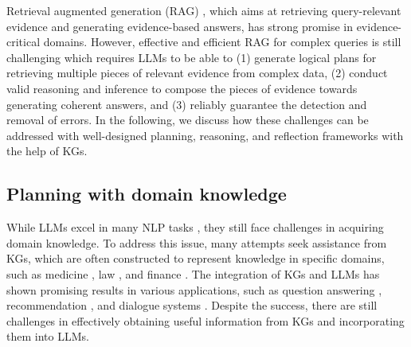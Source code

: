 Retrieval augmented generation (RAG) \cite{lewis2020retrieval}, which aims at retrieving query-relevant evidence and generating evidence-based answers, has strong promise in evidence-critical domains. However, effective and efficient RAG for complex queries is still challenging which requires LLMs to be able to (1) generate logical plans for retrieving multiple pieces of relevant evidence from complex data, (2) conduct valid reasoning and inference to compose the pieces of evidence towards generating coherent answers, and (3) reliably guarantee the detection and removal of errors. In the following, we discuss how these challenges can be addressed with well-designed planning, reasoning, and reflection frameworks with the help of KGs.

{
\newcommand{\ourmethod}{\texttt{RoG}\xspace}
\subsection{Planning with domain knowledge}
While LLMs excel in many NLP tasks \cite{brown2020language,bang2023multitask}, they still face challenges in acquiring domain knowledge. To address this issue, many attempts seek assistance from KGs, which are often constructed to represent knowledge in specific domains, such as medicine \cite{bodenreider2004unified}, law \cite{kang2024bridging}, and finance \cite{liu2019anticipating}. The integration of KGs and LLMs has shown promising results in various applications, such as question answering \cite{jiang2023unikgqa}, recommendation \cite{wang2023enhancing}, and dialogue systems \cite{tuan2022towards}. Despite the success, there are still challenges in effectively obtaining useful information from KGs and incorporating them into LLMs. 

}
